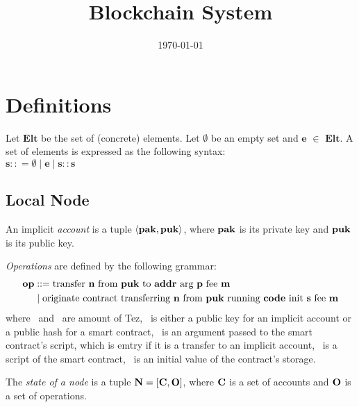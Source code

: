 \documentclass[a4paper]{llncs}
\title{Blockchain System}
\author{}
\institute{}
\date{\today}
\begin{document}
\maketitle
\pagestyle{plain}

\section{Definitions}
\begin{definition}%
Let $\mathbf{Elt}$ be the set of (concrete) elements. Let $\emptyset$ be an empty set and $\mathbf{e}$ $\in$  $\mathbf{Elt}$. A set of elements is expressed as the following syntax:
\\
$\mathbf{s} :: = \emptyset \mid \mathbf{e} \mid \mathbf{s :: s}$
\end{definition}

\subsection{Local Node}
\label{sec:local-node}


\begin{definition}%
  An implicit \emph{account} is a tuple $\langle
  \PAK, \PUK
  \rangle $, where
  $\PAK$ is its private key and $\PUK$ is its public key.
\end{definition}


\begin{definition}%
  \emph{Operations} are defined by the following grammar:
  \begin{align*}
    \OP &::= \TRANSFER[\PARAMETER]\NTEZ\PUK\ADDR\MTEZ
    \\&\mid \ORIGINATE\NTEZ\PUK\CODE\INIT\MTEZ
  \end{align*}
  where \NTEZ\ and \MTEZ\ are amount of Tez, \ADDR\ is either a public key for an implicit account  or a public hash for a smart contract,  \PARAMETER\ is an argument passed to the smart contract's script, which is emtry if it is a transfer to an implicit account, \CODE\ is a script of the smart contract, \INIT\ is an initial value of the contract's storage.
\end{definition}

\begin{definition}%
  The \emph{state of a node} is a tuple
  $\NODE = [\ACCOUNTS, \OPERATIONS]$, where $\ACCOUNTS$ is a set of
  accounts and
  $\OPERATIONS$ is a set of operations.
\end{definition}
\end{document}
